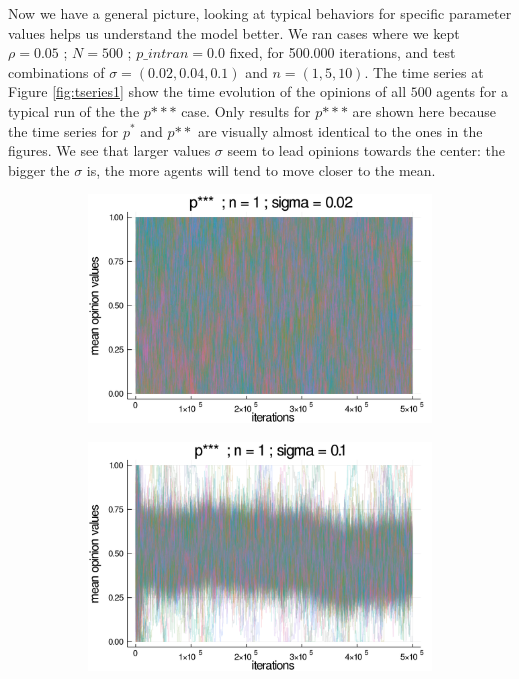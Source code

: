 \documentclass{article}
\begin{document}
    Now we have a general picture, looking at
    typical behaviors for specific parameter values helps us understand the model better. We ran cases where we kept
    \(\rho = 0.05 \) ; \(N = 500\) ; \(p\_intran = 0.0\) fixed, for 500.000
    iterations, and test combinations of $\sigma = (0.02, 0.04, 0.1)$ and $ n =
    (1,5,10)$. The time series at Figure \ref{fig:tseries1} show the time evolution
    of the opinions of all $500$ agents for a typical run of the
    the $p{***}$ case. Only results for $p{***}$ are shown here because the time
    series for $p^*$ and $p{**}$ are visually almost identical to the ones in
    the figures. We see that larger values \(\sigma\) seem to lead opinions towards
    the center: the bigger the \(\sigma\) is, the more agents will tend to move
    closer to the mean.


        \begin{figure}[H]
  \centering
       \begin{subfigure}[b]{0.48\textwidth}
      \includegraphics[width=\textwidth]{img/series/tseries1/Poodlcalculatep***n1-rho005-sigma002-00intransrandom.png}
     \end{subfigure}
    \begin{subfigure}[b]{0.48\textwidth}
      \includegraphics[width=\textwidth]{img/series/tseries1/Poodlcalculatep***n1-rho005-sigma01-00intransrandom.png}

\end{subfigure}
\end{figure}
\end{document}
